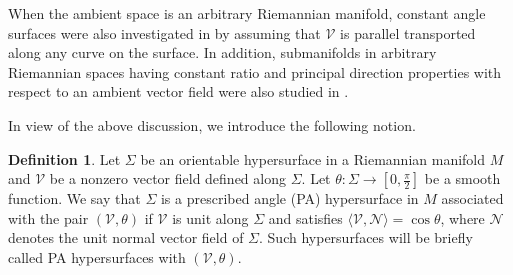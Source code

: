 \documentclass[12pt,reqno]{amsart}
\def\v{\mathcal V}
\def\n{\mathcal N}
\theoremstyle{definition}
\newtheorem{definition}[theorem]{Definition}
\begin{document}
When the ambient space is an arbitrary Riemannian manifold, constant angle surfaces  were also investigated in \cite{dgd} by assuming that $\v$ is parallel transported along any curve on the surface. In addition, submanifolds in arbitrary Riemannian spaces having constant ratio and principal direction properties with respect to an ambient vector field were also studied in \cite{mtv}. %

In view of the above discussion, we introduce the following notion.

\begin{definition}\label{d-pa}
Let $\Sigma$ be an orientable hypersurface in a Riemannian manifold $M$ and $\v$ be a nonzero vector field defined along $\Sigma$. Let $\theta:\Sigma\to [0,\frac{\pi}{2}]$ be a smooth function. We say that $\Sigma$ is a prescribed angle (PA) hypersurface in $M$ associated with the pair $(\v,\theta)$ if $\v$ is unit along $\Sigma$ and satisfies $\langle \v,\n\rangle=\cos \theta$, where $\n$ denotes the unit normal vector field of $\Sigma$. Such hypersurfaces will be briefly called PA hypersurfaces with $(\v,\theta)$. 
\end{definition}
\end{document}
